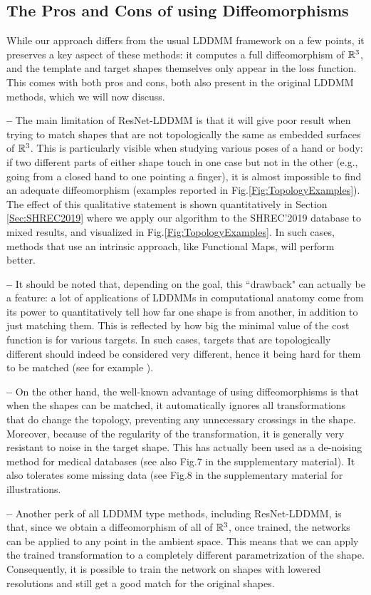 \subsection{The Pros and Cons of using Diffeomorphisms}
\label{Sec:limitations}
While our approach differs from the usual LDDMM framework on a few points, it preserves a key aspect of these methods: it computes a full diffeomorphism of ${\mathbb R}^3$, and the template and target shapes themselves only appear in the loss function. This comes with both pros and cons, both also present in the original LDDMM methods, which we will now discuss.

\textbf{--} The main limitation of ResNet-LDDMM is that it will give poor result when trying to match shapes that are not topologically the same as embedded surfaces of ${\mathbb R}^3$. This is particularly visible when studying various poses of a hand or body: if two different parts of either shape touch in one case but not in the other (e.g., going from a closed hand to one pointing a finger), it is almost impossible to find an adequate diffeomorphism (examples reported in Fig.\ref{Fig:TopologyExamples}). The effect of this qualitative statement is shown quantitatively in Section \ref{Sec:SHREC2019} where we apply our algorithm to the SHREC'2019 database to mixed results, and visualized in Fig.\ref{Fig:TopologyExamples}. In such cases, methods that use an intrinsic approach, like Functional Maps, will perform better. 

\textbf{--} It should be noted that, depending on the goal, this ``drawback" can actually be a feature: a lot of applications of LDDMMs in computational anatomy come from its power to quantitatively tell how far one shape is from another, in addition to just matching them. This is reflected by how big the minimal value of the cost function is for various targets. In such cases, targets that are topologically different should indeed be considered very different, hence it being hard for them to be matched (see for example \cite{miller2007lddmm}).

\textbf{--} On the other hand, the well-known advantage of using diffeomorphisms is that when the shapes can be matched, it automatically ignores all transformations that do change the topology, preventing any unnecessary crossings in the shape. Moreover, because of the regularity of the transformation, it is generally very resistant to noise in the target shape. This has actually been used as a de-noising method for medical databases \cite{tward2013lddmm} (see also Fig.7 in the supplementary material). It also tolerates some missing data (see Fig.8 in the supplementary material for illustrations.

\textbf{--} Another perk of all LDDMM type methods, including ResNet-LDDMM, is that, since we obtain a diffeomorphism of all of ${\mathbb R}^3$, once trained, the networks can be applied to any point in the ambient space. This means that we can apply the trained transformation to a completely different parametrization of the shape. Consequently, it is possible to train the network on shapes with lowered resolutions and still get a good match for the original shapes.